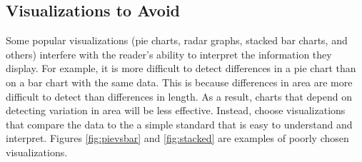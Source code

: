 \subsection*{Visualizations to Avoid} %

Some popular visualizations (pie charts, radar graphs, stacked bar charts, and others) interfere with the reader's ability to interpret the information they display.
For example, it is more difficult to detect differences in a pie chart than on a bar chart with the same data.
This is because differences in area are more difficult to detect than differences in length.
As a result, charts that depend on detecting variation in area will be less effective.
Instead, choose visualizations that compare the data to the a simple standard that is easy to understand and interpret.
Figures \ref{fig:pievsbar} and \ref{fig:stacked} are examples of poorly chosen visualizations.

